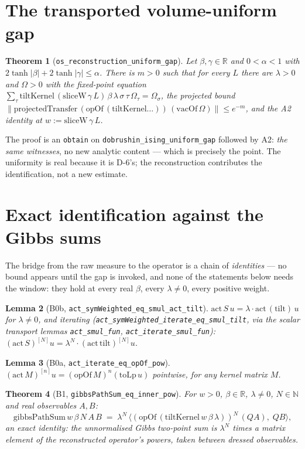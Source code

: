 \documentclass[11pt]{article}
\newtheorem{theorem}{Theorem}[section]
\newtheorem{lemma}[theorem]{Lemma}
\newcommand{\lean}[1]{\texttt{#1}}
\begin{document}
\section{The transported volume-uniform gap}\label{sec:gap}
\begin{theorem}[\lean{os\_reconstruction\_uniform\_gap}]
Let $\beta, \gamma \in \mathbb{R}$ and $0 < \alpha < 1$ with
$2\tanh|\beta|+2\tanh|\gamma| \le \alpha$.  There is $m>0$ such that
for every $L$ there are $\lambda > 0$ and $\Omega > 0$
with the fixed-point equation
$\sum_\tau \mathrm{tiltKernel}\,(\mathrm{sliceW}\,\gamma\,L)\,\beta\,
\lambda\,\sigma\,\tau\,\Omega_\tau = \Omega_\sigma$, the projected
bound $\lVert\mathrm{projectedTransfer}\,
(\mathrm{opOf}\,(\mathrm{tiltKernel}\ldots))\,(\mathrm{vacOf}\,\Omega)
\rVert \le e^{-m}$, and the A2 identity at
$w := \mathrm{sliceW}\,\gamma\,L$.
\end{theorem}
The proof is an \lean{obtain} on \lean{dobrushin\_ising\_uniform\_gap}
followed by A2: \emph{the same witnesses}, no new analytic content ---
which is precisely the point.  The uniformity is real because it is
D-6's; the reconstruction contributes the identification, not a new
estimate.

\section{Exact identification against the Gibbs sums}
\label{sec:measure}
The bridge from the raw measure to the operator is a chain of
\emph{identities} --- no bound appears until the gap is invoked, and
none of the statements below needs the window: they hold at every real
$\beta$, every $\lambda \ne 0$, every positive weight.

\begin{lemma}[B0b, \lean{act\_symWeighted\_eq\_smul\_act\_tilt}]
$\mathrm{act}\,S\,u = \lambda\cdot \mathrm{act}\,(\mathrm{tilt})\,u$
for $\lambda \ne 0$, and iterating
(\lean{act\_symWeighted\_iterate\_eq\_smul\_tilt}, via the scalar
transport lemmas \lean{act\_smul\_fun},
\lean{act\_iterate\_smul\_fun}):
$(\mathrm{act}\,S)^{[N]} u = \lambda^N \cdot
(\mathrm{act}\,\mathrm{tilt})^{[N]} u$.
\end{lemma}

\begin{lemma}[B0a, \lean{act\_iterate\_eq\_opOf\_pow}]
$(\mathrm{act}\,M)^{[n]} u = (\mathrm{opOf}\,M)^n(\mathrm{toLp}\,u)$
pointwise, for any kernel matrix $M$.
\end{lemma}

\begin{theorem}[B1, \lean{gibbsPathSum\_eq\_inner\_pow}]
For $w > 0$, $\beta \in \mathbb{R}$, $\lambda \ne 0$, $N \in
\mathbb{N}$ and real observables $A, B$:
\[
\mathrm{gibbsPathSum}\,w\,\beta\,N\,A\,B
  \;=\; \lambda^N\,
  \bigl\langle (\mathrm{opOf}\,(\mathrm{tiltKernel}\,w\,\beta\,
  \lambda))^N\, (Q A),\; Q B \bigr\rangle ,
\]
an exact identity: the unnormalised Gibbs two-point sum \emph{is}
$\lambda^N$ times a matrix element of the reconstructed operator's
powers, taken between dressed observables.
\end{theorem}
\end{document}
